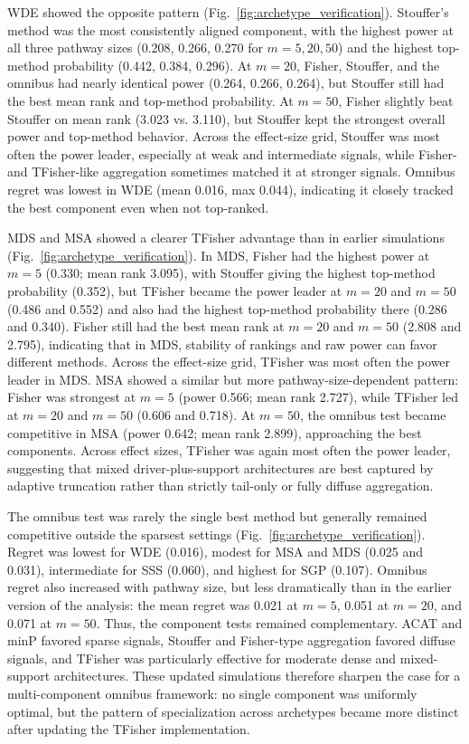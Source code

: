 \documentclass[unnumsec,webpdf,contemporary,large]{oup-authoring-template}%
\theoremstyle{thmstyleone}%
\theoremstyle{thmstyletwo}%
\theoremstyle{thmstylethree}%
\begin{document}
WDE showed the opposite pattern (Fig.~\ref{fig:archetype_verification}). Stouffer's method was the most consistently aligned component, with the highest power at all three pathway sizes (0.208, 0.266, 0.270 for \(m=5,20,50\)) and the highest top-method probability (0.442, 0.384, 0.296). At \(m=20\), Fisher, Stouffer, and the omnibus had nearly identical power (0.264, 0.266, 0.264), but Stouffer still had the best mean rank and top-method probability. At \(m=50\), Fisher slightly beat Stouffer on mean rank (3.023 vs. 3.110), but Stouffer kept the strongest overall power and top-method behavior. Across the effect-size grid, Stouffer was most often the power leader, especially at weak and intermediate signals, while Fisher- and TFisher-like aggregation sometimes matched it at stronger signals. Omnibus regret was lowest in WDE (mean 0.016, max 0.044), indicating it closely tracked the best component even when not top-ranked.

MDS and MSA showed a clearer TFisher advantage than in earlier simulations (Fig.~\ref{fig:archetype_verification}). In MDS, Fisher had the highest power at \(m=5\) (0.330; mean rank 3.095), with Stouffer giving the highest top-method probability (0.352), but TFisher became the power leader at \(m=20\) and \(m=50\) (0.486 and 0.552) and also had the highest top-method probability there (0.286 and 0.340). Fisher still had the best mean rank at \(m=20\) and \(m=50\) (2.808 and 2.795), indicating that in MDS, stability of rankings and raw power can favor different methods. Across the effect-size grid, TFisher was most often the power leader in MDS. MSA showed a similar but more pathway-size-dependent pattern: Fisher was strongest at \(m=5\) (power 0.566; mean rank 2.727), while TFisher led at \(m=20\) and \(m=50\) (0.606 and 0.718). At \(m=50\), the omnibus test became competitive in MSA (power 0.642; mean rank 2.899), approaching the best components. Across effect sizes, TFisher was again most often the power leader, suggesting that mixed driver-plus-support architectures are best captured by adaptive truncation rather than strictly tail-only or fully diffuse aggregation.

The omnibus test was rarely the single best method but generally remained competitive outside the sparsest settings (Fig.~\ref{fig:archetype_verification}). Regret was lowest for WDE (0.016), modest for MSA and MDS (0.025 and 0.031), intermediate for SSS (0.060), and highest for SGP (0.107). Omnibus regret also increased with pathway size, but less dramatically than in the earlier version of the analysis: the mean regret was 0.021 at \(m=5\), 0.051 at \(m=20\), and 0.071 at \(m=50\). Thus, the component tests remained complementary. ACAT and minP favored sparse signals, Stouffer and Fisher-type aggregation favored diffuse signals, and TFisher was particularly effective for moderate dense and mixed-support architectures. These updated simulations therefore sharpen the case for a multi-component omnibus framework: no single component was uniformly optimal, but the pattern of specialization across archetypes became more distinct after updating the TFisher implementation.
\end{document}

